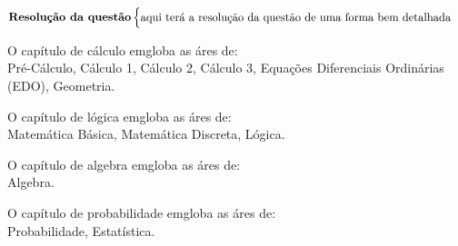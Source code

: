\documentclass{article}
\begin{document}
$

    \noindent \textbf{Resolução da questão}\newline
    \begin{cases}
        \mbox{aqui terá a resolução da questão de uma forma bem detalhada}    
    \end{cases}
$
\vspace{50}

O capítulo de cálculo emgloba as áres de:\\
Pré-Cálculo, Cálculo 1, Cálculo 2, Cálculo 3, Equações Diferenciais Ordinárias (EDO), Geometria.\vspace{20}


O capítulo de lógica emgloba as áres de:\\
Matemática Básica, Matemática Discreta, Lógica.\vspace{20}


O capítulo de algebra emgloba as áres de:\\
Algebra.\vspace{20}


O capítulo de probabilidade emgloba as áres de:\\
Probabilidade, Estatística.

\newpage



































\newpage
\end{document}

